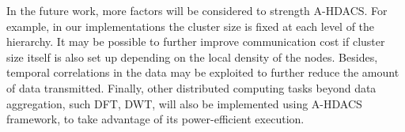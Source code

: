 \documentclass[conference]{IEEEtran}
\begin{document}
In the future work, more factors will be considered to strength A-HDACS. For example, 
in our implementations the cluster size is fixed at each level of the hierarchy. 
It may be possible to further improve communication cost if 
cluster size itself is also set up depending on the local density of the nodes. Besides, temporal correlations in the data may be exploited to further reduce
the amount of data transmitted. Finally, other distributed computing tasks beyond data aggregation, such DFT, DWT, will also be implemented using  
A-HDACS framework, to take advantage of its power-efficient execution. 


\end{document}
